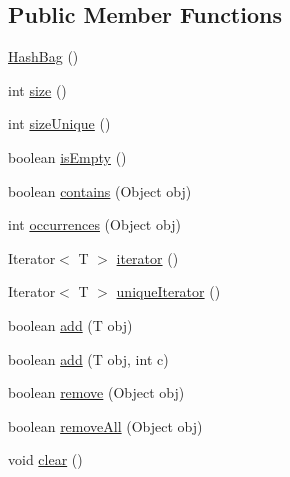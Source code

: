 \subsection*{Public Member Functions}
\begin{DoxyCompactItemize}
\item 
\hyperlink{classorg_1_1tzi_1_1use_1_1util_1_1collections_1_1_hash_bag_3_01_t_01_4_a69e042ba261a366ba68e78a43e81a46b}{Hash\-Bag} ()
\item 
int \hyperlink{classorg_1_1tzi_1_1use_1_1util_1_1collections_1_1_hash_bag_3_01_t_01_4_a9f769b8ee6f685a4441e224f58a2ed77}{size} ()
\item 
int \hyperlink{classorg_1_1tzi_1_1use_1_1util_1_1collections_1_1_hash_bag_3_01_t_01_4_aa4db4e6ad11a14797312f81a8e4fec2c}{size\-Unique} ()
\item 
boolean \hyperlink{classorg_1_1tzi_1_1use_1_1util_1_1collections_1_1_hash_bag_3_01_t_01_4_acd1de3554997f8d6cc67aac9b0c76458}{is\-Empty} ()
\item 
boolean \hyperlink{classorg_1_1tzi_1_1use_1_1util_1_1collections_1_1_hash_bag_3_01_t_01_4_aa8d586fada58622c5397dc618dd9ecf5}{contains} (Object obj)
\item 
int \hyperlink{classorg_1_1tzi_1_1use_1_1util_1_1collections_1_1_hash_bag_3_01_t_01_4_ab0b5352c0814bae916eb40c090a733ef}{occurrences} (Object obj)
\item 
Iterator$<$ T $>$ \hyperlink{classorg_1_1tzi_1_1use_1_1util_1_1collections_1_1_hash_bag_3_01_t_01_4_ac55292b5f43aca3b01a0dcf0f2347eca}{iterator} ()
\item 
Iterator$<$ T $>$ \hyperlink{classorg_1_1tzi_1_1use_1_1util_1_1collections_1_1_hash_bag_3_01_t_01_4_a9ca7e3a3af945b882daefb70f2e1126f}{unique\-Iterator} ()
\item 
boolean \hyperlink{classorg_1_1tzi_1_1use_1_1util_1_1collections_1_1_hash_bag_3_01_t_01_4_a60b3afb049055c1d86f35b9946c4c295}{add} (T obj)
\item 
boolean \hyperlink{classorg_1_1tzi_1_1use_1_1util_1_1collections_1_1_hash_bag_3_01_t_01_4_afb647e577dbd5b8c09071faf96d4f82e}{add} (T obj, int c)
\item 
boolean \hyperlink{classorg_1_1tzi_1_1use_1_1util_1_1collections_1_1_hash_bag_3_01_t_01_4_add335ae187bfd3cb51c6ced08eaf3e67}{remove} (Object obj)
\item 
boolean \hyperlink{classorg_1_1tzi_1_1use_1_1util_1_1collections_1_1_hash_bag_3_01_t_01_4_a73892e21803a2cf185e327f410df544a}{remove\-All} (Object obj)
\item 
void \hyperlink{classorg_1_1tzi_1_1use_1_1util_1_1collections_1_1_hash_bag_3_01_t_01_4_ae7382a252d09336ea0b4c36a71c02682}{clear} ()
\end{DoxyCompactItemize}


